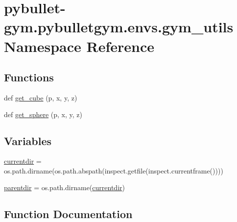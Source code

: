 \hypertarget{namespacepybullet-gym_1_1pybulletgym_1_1envs_1_1gym__utils}{}\section{pybullet-\/gym.pybulletgym.\+envs.\+gym\+\_\+utils Namespace Reference}
\label{namespacepybullet-gym_1_1pybulletgym_1_1envs_1_1gym__utils}
\subsection*{Functions}
\begin{DoxyCompactItemize}
\item 
def \hyperlink{namespacepybullet-gym_1_1pybulletgym_1_1envs_1_1gym__utils_aa9d4ed723bce8939fe9836075764d50e}{get\+\_\+cube} (p, x, y, z)
\item 
def \hyperlink{namespacepybullet-gym_1_1pybulletgym_1_1envs_1_1gym__utils_ae8869070c90d32fcd522b276274dcebe}{get\+\_\+sphere} (p, x, y, z)
\end{DoxyCompactItemize}
\subsection*{Variables}
\begin{DoxyCompactItemize}
\item 
\hyperlink{namespacepybullet-gym_1_1pybulletgym_1_1envs_1_1gym__utils_acbef40ccd280f1acccdbc39de15cc558}{currentdir} = os.\+path.\+dirname(os.\+path.\+abspath(inspect.\+getfile(inspect.\+currentframe())))
\item 
\hyperlink{namespacepybullet-gym_1_1pybulletgym_1_1envs_1_1gym__utils_ab157a243fec342ebf1d0a34372f53dc1}{parentdir} = os.\+path.\+dirname(\hyperlink{namespacepybullet-gym_1_1pybulletgym_1_1envs_1_1gym__utils_acbef40ccd280f1acccdbc39de15cc558}{currentdir})
\end{DoxyCompactItemize}


\subsection{Function Documentation}
